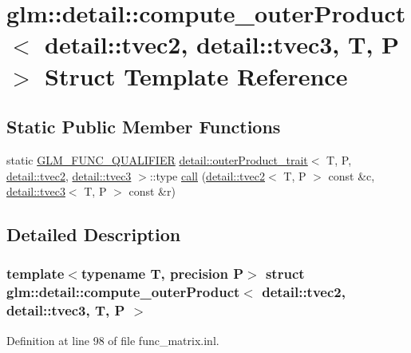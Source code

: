\hypertarget{structglm_1_1detail_1_1compute__outer_product_3_01detail_1_1tvec2_00_01detail_1_1tvec3_00_01_t_00_01_p_01_4}{}\section{glm\+:\+:detail\+:\+:compute\+\_\+outer\+Product$<$ detail\+:\+:tvec2, detail\+:\+:tvec3, T, P $>$ Struct Template Reference}
\label{structglm_1_1detail_1_1compute__outer_product_3_01detail_1_1tvec2_00_01detail_1_1tvec3_00_01_t_00_01_p_01_4}
\subsection*{Static Public Member Functions}
\begin{DoxyCompactItemize}
\item 
static \hyperlink{setup_8hpp_a33fdea6f91c5f834105f7415e2a64407}{G\+L\+M\+\_\+\+F\+U\+N\+C\+\_\+\+Q\+U\+A\+L\+I\+F\+I\+ER} \hyperlink{structglm_1_1detail_1_1outer_product__trait}{detail\+::outer\+Product\+\_\+trait}$<$ T, P, \hyperlink{structglm_1_1detail_1_1tvec2}{detail\+::tvec2}, \hyperlink{structglm_1_1detail_1_1tvec3}{detail\+::tvec3} $>$\+::type \hyperlink{structglm_1_1detail_1_1compute__outer_product_3_01detail_1_1tvec2_00_01detail_1_1tvec3_00_01_t_00_01_p_01_4_af6f9ddad4215d4169d2cd021bd1769f4}{call} (\hyperlink{structglm_1_1detail_1_1tvec2}{detail\+::tvec2}$<$ T, P $>$ const \&c, \hyperlink{structglm_1_1detail_1_1tvec3}{detail\+::tvec3}$<$ T, P $>$ const \&r)
\end{DoxyCompactItemize}


\subsection{Detailed Description}
\subsubsection*{template$<$typename T, precision P$>$\newline
struct glm\+::detail\+::compute\+\_\+outer\+Product$<$ detail\+::tvec2, detail\+::tvec3, T, P $>$}



Definition at line 98 of file func\+\_\+matrix.\+inl.




